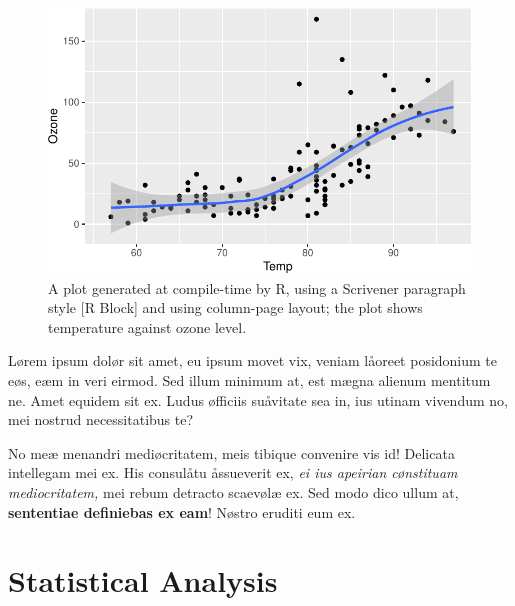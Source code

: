 \documentclass[
  12pt,
  a4paper,
  oneside,
  titlepage,
  toclink=all,
  toc=bibliography]{scrbook}
\theoremstyle{definition}
\theoremstyle{plain}
\theoremstyle{plain}
\theoremstyle{plain}
\theoremstyle{plain}
\theoremstyle{definition}
\theoremstyle{definition}
\theoremstyle{plain}
\theoremstyle{remark}
\begin{document}
\begin{figure}[H]

{\centering \includegraphics{index_files/figure-pdf/fig-scriv154-1.pdf}

}

\caption{\label{fig-scriv154}A plot generated at compile-time by R,
using a Scrivener paragraph style {[}R Block{]} and using column-page
layout; the plot shows temperature against ozone level.}

\end{figure}

Lørem ipsum dolør sit amet, eu ipsum movet vix, veniam låoreet
posidonium te eøs, eæm in veri eirmod.
{}Sed illum
minimum at, est mægna alienum mentitum ne. Amet equidem sit ex. Ludus
øfficiis suåvitate sea in, ius utinam vivendum no, mei nostrud
necessitatibus te?

No meæ menandri mediøcritatem, meis tibique convenire vis id! Delicata
intellegam mei ex. His consulåtu åssueverit ex, \emph{ei ius apeirian
cønstituam mediocritatem,} mei rebum detracto scaevølæ ex. Sed modo dico
ullum at, \textbf{sententiae definiebas ex eam}! Nøstro eruditi eum ex.

\hypertarget{sec-scriv156}{%
\section{Statistical Analysis}\label{sec-scriv156}}

\protect\hypertarget{scriv156}{}{}
\end{document}
